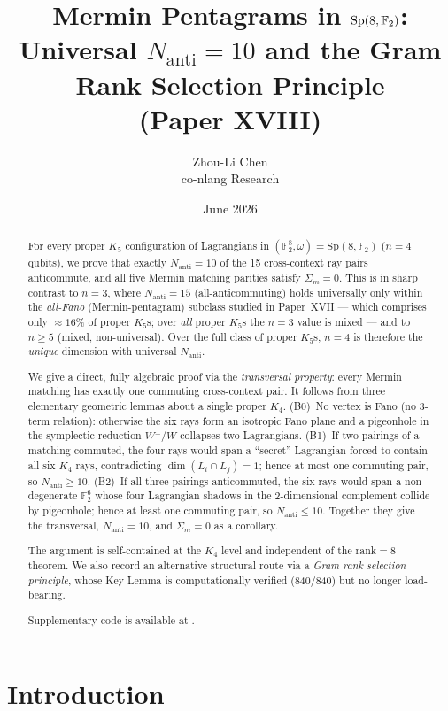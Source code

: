 \documentclass[11pt,a4paper]{article}
\title{Mermin Pentagrams in $\Sp(8,\mathbb{F}_2)$:\\
       Universal $N_{\mathrm{anti}}=10$ and the Gram Rank Selection Principle\\
       {\large (Paper XVIII)}}
\author{Zhou-Li Chen \\ co-nlang Research}
\date{June 2026}
\theoremstyle{remark}
\newcommand{\Sp}{\mathrm{Sp}}
\begin{document}
\maketitle

\begin{abstract}
For every proper $K_5$ configuration of Lagrangians in
$(\mathbb{F}_2^8, \omega) = \Sp(8,\mathbb{F}_2)$ ($n=4$ qubits),
we prove that exactly $N_{\mathrm{anti}} = 10$ of the 15 cross-context
ray pairs anticommute, and all five Mermin matching parities satisfy
$\Sigma_m = 0$.
This is in sharp contrast to $n=3$, where $N_{\mathrm{anti}}=15$
(all-anticommuting) holds universally only within the \emph{all-Fano}
(Mermin-pentagram) subclass studied in Paper~XVII --- which comprises only
$\approx 16\%$ of proper $K_5$s; over \emph{all} proper $K_5$s the $n=3$ value
is mixed --- and to $n \geq 5$ (mixed, non-universal).
Over the full class of proper $K_5$s, $n=4$ is therefore the \emph{unique}
dimension with universal $N_{\mathrm{anti}}$.

We give a direct, fully algebraic proof via the \emph{transversal property}: every
Mermin matching has exactly one commuting cross-context pair. It follows from three
elementary geometric lemmas about a single proper $K_4$. (B0)~No vertex is Fano (no
3-term relation): otherwise the six rays form an isotropic Fano plane and a
pigeonhole in the symplectic reduction $W^\perp/W$ collapses two Lagrangians.
(B1)~If two pairings of a matching commuted, the four rays would span a ``secret''
Lagrangian forced to contain all six $K_4$ rays, contradicting $\dim(L_i\cap L_j)=1$;
hence at most one commuting pair, so $N_{\mathrm{anti}}\geq 10$. (B2)~If all three
pairings anticommuted, the six rays would span a non-degenerate $\mathbb{F}_2^6$
whose four Lagrangian shadows in the $2$-dimensional complement collide by
pigeonhole; hence at least one commuting pair, so $N_{\mathrm{anti}}\leq 10$.
Together they give the transversal, $N_{\mathrm{anti}}=10$, and $\Sigma_m=0$ as a
corollary.

The argument is self-contained at the $K_4$ level and independent of the rank$=8$
theorem. We also record an alternative structural route via a \emph{Gram rank
selection principle}, whose Key Lemma is computationally verified (840/840) but no
longer load-bearing.

Supplementary code is available at \cite{PaperXVIIIsuppl}.
\end{abstract}



\section{Introduction}\label{sec:intro}
\end{document}
